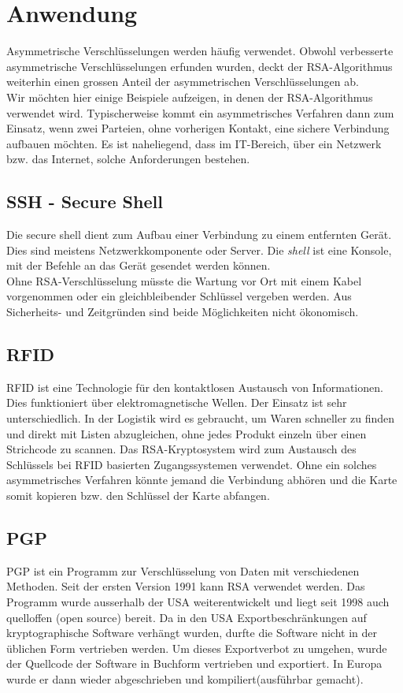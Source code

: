 \section{Anwendung}
Asymmetrische Verschlüsselungen werden häufig verwendet.  Obwohl verbesserte asymmetrische Verschlüsselungen erfunden wurden, deckt der RSA-Algorithmus weiterhin einen grossen Anteil der asymmetrischen Verschlüsselungen ab.\\
Wir möchten hier einige Beispiele aufzeigen, in denen der RSA-Algorithmus verwendet wird. Typischerweise kommt ein asymmetrisches Verfahren dann zum Einsatz, wenn zwei Parteien, ohne vorherigen Kontakt, eine sichere Verbindung aufbauen möchten. Es ist naheliegend, dass im IT-Bereich, über ein Netzwerk bzw. das Internet, solche Anforderungen bestehen.
%
\subsection{SSH - Secure Shell}
Die secure shell dient zum Aufbau einer Verbindung zu einem entfernten Gerät. Dies sind meistens Netzwerkkomponente oder Server. Die \textit{shell} ist eine Konsole, mit der Befehle an das Gerät gesendet werden können.\\
Ohne RSA-Verschlüsselung müsste die Wartung vor Ort mit einem Kabel vorgenommen oder ein gleichbleibender Schlüssel vergeben werden. Aus Sicherheits- und Zeitgründen sind beide Möglichkeiten nicht ökonomisch.
%
\subsection{RFID}
RFID ist eine Technologie für den kontaktlosen Austausch von Informationen. Dies funktioniert über elektromagnetische Wellen. Der Einsatz ist sehr unterschiedlich. In der Logistik wird es gebraucht, um Waren schneller zu finden und direkt mit Listen abzugleichen, ohne jedes Produkt einzeln über einen Strichcode zu scannen. Das RSA-Kryptosystem wird zum Austausch des Schlüssels bei RFID basierten Zugangssystemen verwendet. Ohne ein solches asymmetrisches Verfahren könnte jemand die Verbindung abhören und die Karte somit kopieren bzw. den Schlüssel der Karte abfangen.

\subsection{PGP}
PGP ist ein Programm zur Verschlüsselung von Daten mit verschiedenen Methoden. Seit der ersten Version 1991 kann RSA verwendet werden. Das Programm wurde ausserhalb der USA weiterentwickelt und liegt seit 1998 auch quelloffen (open source) bereit. Da in den USA Exportbeschränkungen auf kryptographische Software verhängt wurden, durfte die Software nicht in der üblichen Form vertrieben werden. Um dieses Exportverbot zu umgehen, wurde der Quellcode der Software in Buchform vertrieben und exportiert. In Europa wurde er dann wieder abgeschrieben und kompiliert(ausführbar gemacht). 

